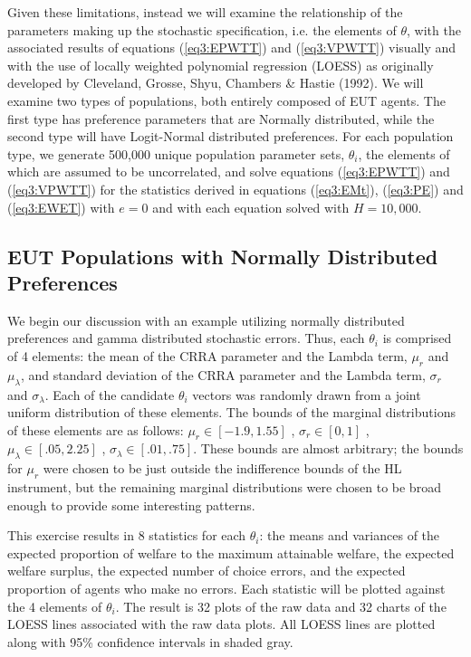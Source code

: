 \documentclass[../main.tex]{subfiles}
\begin{document}
Given these limitations, instead we will examine the relationship of the parameters making up the stochastic specification, i.e. the elements of $\theta$, with the associated results of equations (\ref{eq3:EPWTT}) and (\ref{eq3:VPWTT}) visually and with the use of locally weighted polynomial regression (LOESS) as originally developed by Cleveland, Grosse, Shyu, Chambers \& Hastie (1992).
We will examine two types of populations, both entirely composed of EUT agents.
The first type has preference parameters that are Normally distributed, while the second type will have Logit-Normal distributed preferences.
For each population type, we generate 500,000 unique population parameter sets, $\theta_i$, the elements of which are assumed to be uncorrelated, and solve equations (\ref{eq3:EPWTT}) and (\ref{eq3:VPWTT}) for the statistics derived in equations (\ref{eq3:EMt}), (\ref{eq3:PE}) and (\ref{eq3:EWET}) with $e=0$ and with each equation solved with $H=10,000$.

\subsection{EUT Populations with Normally Distributed Preferences}

We begin our discussion with an example utilizing normally distributed preferences and gamma distributed stochastic errors.
Thus, each $\theta_i$ is comprised of 4 elements: the mean of the CRRA parameter and the Lambda term, $\mu_r$ and $\mu_\lambda$, and standard deviation of the CRRA parameter and the Lambda term, $\sigma_r$ and $\sigma_\lambda$. Each of the candidate $\theta_i$ vectors was randomly drawn from a joint uniform distribution of these elements.
The bounds of the marginal distributions of these elements are as follows: $\mu_r \in [-1.9 , 1.55 ]$ , $\sigma_r \in [0 , 1]$ , $\mu_\lambda \in [.05 , 2.25]$ , $\sigma_\lambda \in [.01 , .75]$. 
These bounds are almost arbitrary; the bounds for $\mu_r$ were chosen to be just outside the indifference bounds of the HL instrument, but the remaining marginal distributions were chosen to be broad enough to provide some interesting patterns.

This exercise results in 8 statistics for each $\theta_i$: the means and variances of the expected proportion of welfare to the maximum attainable welfare, the expected welfare surplus, the expected number of choice errors, and the expected proportion of agents who make no errors.
Each statistic will be plotted against the 4 elements of $\theta_i$.
The result is 32 plots of the raw data and 32 charts of the LOESS lines associated with the raw data plots.
All LOESS lines are plotted along with 95\% confidence intervals in shaded gray.
\end{document}
